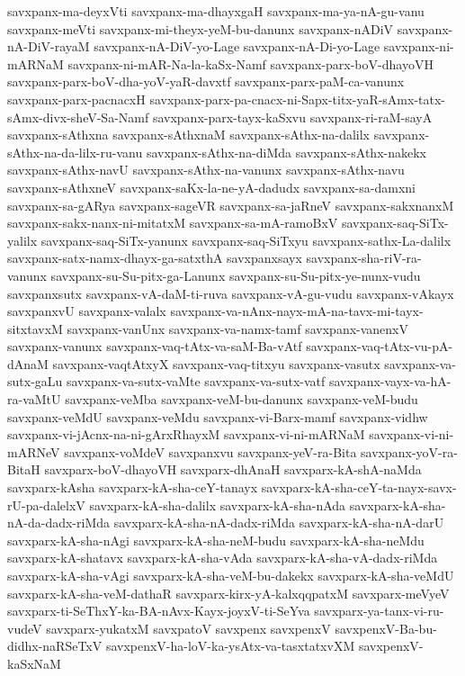 {savxpanx-ma-deyxVti
savxpanx-ma-dhayxgaH
savxpanx-ma-ya-nA-gu-vanu
savxpanx-meVti
savxpanx-mi-theyx-yeM-bu-danunx
savxpanx-nADiV
savxpanx-nA-DiV-rayaM
savxpanx-nA-DiV-yo-Lage
savxpanx-nA-Di-yo-Lage
savxpanx-ni-mARNaM
savxpanx-ni-mAR-Na-la-kaSx-Namf
savxpanx-parx-boV-dhayoVH
savxpanx-parx-boV-dha-yoV-yaR-davxtf
savxpanx-parx-paM-ca-vanunx
savxpanx-parx-pacnacxH
savxpanx-parx-pa-cnacx-ni-Sapx-titx-yaR-sAmx-tatx-sAmx-divx-sheV-Sa-Namf
savxpanx-parx-tayx-kaSxvu
savxpanx-ri-raM-sayA
savxpanx-sAthxna
savxpanx-sAthxnaM
savxpanx-sAthx-na-dalilx
savxpanx-sAthx-na-da-lilx-ru-vanu
savxpanx-sAthx-na-diMda
savxpanx-sAthx-nakekx
savxpanx-sAthx-navU
savxpanx-sAthx-na-vanunx
savxpanx-sAthx-navu
savxpanx-sAthxneV
savxpanx-saKx-la-ne-yA-dadudx
savxpanx-sa-damxni
savxpanx-sa-gARya
savxpanx-sageVR
savxpanx-sa-jaRneV
savxpanx-sakxnanxM
savxpanx-sakx-nanx-ni-mitatxM
savxpanx-sa-mA-ramoBxV
savxpanx-saq-SiTx-yalilx
savxpanx-saq-SiTx-yanunx
savxpanx-saq-SiTxyu
savxpanx-sathx-La-dalilx
savxpanx-satx-namx-dhayx-ga-satxthA
savxpanxsayx
savxpanx-sha-riV-ra-vanunx
savxpanx-su-Su-pitx-ga-Lanunx
savxpanx-su-Su-pitx-ye-nunx-vudu
savxpanxsutx
savxpanx-vA-daM-ti-ruva
savxpanx-vA-gu-vudu
savxpanx-vAkayx
savxpanxvU
savxpanx-valalx
savxpanx-va-nAnx-nayx-mA-na-tavx-mi-tayx-sitxtavxM
savxpanx-vanUnx
savxpanx-va-namx-tamf
savxpanx-vanenxV
savxpanx-vanunx
savxpanx-vaq-tAtx-va-saM-Ba-vAtf
savxpanx-vaq-tAtx-vu-pA-dAnaM
savxpanx-vaqtAtxyX
savxpanx-vaq-titxyu
savxpanx-vasutx
savxpanx-va-sutx-gaLu
savxpanx-va-sutx-vaMte
savxpanx-va-sutx-vatf
savxpanx-vayx-va-hA-ra-vaMtU
savxpanx-veMba
savxpanx-veM-bu-danunx
savxpanx-veM-budu
savxpanx-veMdU
savxpanx-veMdu
savxpanx-vi-Barx-mamf
savxpanx-vidhw
savxpanx-vi-jAcnx-na-ni-gArxRhayxM
savxpanx-vi-ni-mARNaM
savxpanx-vi-ni-mARNeV
savxpanx-voMdeV
savxpanxvu
savxpanx-yeV-ra-Bita
savxpanx-yoV-ra-BitaH
savxparx-boV-dhayoVH
savxparx-dhAnaH
savxparx-kA-shA-naMda
savxparx-kAsha
savxparx-kA-sha-ceY-tanayx
savxparx-kA-sha-ceY-ta-nayx-savx-rU-pa-dalelxV
savxparx-kA-sha-dalilx
savxparx-kA-sha-nAda
savxparx-kA-sha-nA-da-dadx-riMda
savxparx-kA-sha-nA-dadx-riMda
savxparx-kA-sha-nA-darU
savxparx-kA-sha-nAgi
savxparx-kA-sha-neM-budu
savxparx-kA-sha-neMdu
savxparx-kA-shatavx
savxparx-kA-sha-vAda
savxparx-kA-sha-vA-dadx-riMda
savxparx-kA-sha-vAgi
savxparx-kA-sha-veM-bu-dakekx
savxparx-kA-sha-veMdU
savxparx-kA-sha-veM-dathaR
savxparx-kirx-yA-kalxqqpatxM
savxparx-meVyeV
savxparx-ti-SeThxY-ka-BA-nAvx-Kayx-joyxV-ti-SeYva
savxparx-ya-tanx-vi-ru-vudeV
savxparx-yukatxM
savxpatoV
savxpenx
savxpenxV
savxpenxV-Ba-bu-didhx-naRSeTxV
savxpenxV-ha-loV-ka-ysAtx-va-tasxtatxvXM
savxpenxV-kaSxNaM
}
